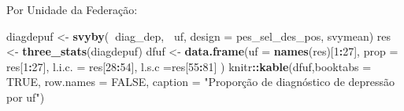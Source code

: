 \documentclass[]{book}
\newenvironment{Shaded}{\begin{snugshade}}{\end{snugshade}}
\newcommand{\KeywordTok}[1]{\textcolor[rgb]{0.13,0.29,0.53}{\textbf{#1}}}
\newcommand{\DataTypeTok}[1]{\textcolor[rgb]{0.13,0.29,0.53}{#1}}
\newcommand{\DecValTok}[1]{\textcolor[rgb]{0.00,0.00,0.81}{#1}}
\newcommand{\StringTok}[1]{\textcolor[rgb]{0.31,0.60,0.02}{#1}}
\newcommand{\OtherTok}[1]{\textcolor[rgb]{0.56,0.35,0.01}{#1}}
\newcommand{\OperatorTok}[1]{\textcolor[rgb]{0.81,0.36,0.00}{\textbf{#1}}}
\newcommand{\NormalTok}[1]{#1}
\theoremstyle{definition}
\theoremstyle{definition}
\theoremstyle{definition}
\theoremstyle{remark}
\begin{document}
Por Unidade da Federação:

\begin{Shaded}
\begin{Highlighting}[]
\NormalTok{diagdepuf <-}\StringTok{ }\KeywordTok{svyby}\NormalTok{(}\OperatorTok{~}\NormalTok{diag_dep, }\OperatorTok{~}\NormalTok{uf, }\DataTypeTok{design =}\NormalTok{ pes_sel_des_pos, svymean)}
\NormalTok{res <-}\StringTok{ }\KeywordTok{three_stats}\NormalTok{(diagdepuf)}
\NormalTok{dfuf <-}\StringTok{ }\KeywordTok{data.frame}\NormalTok{(}\DataTypeTok{uf =} \KeywordTok{names}\NormalTok{(res)[}\DecValTok{1}\OperatorTok{:}\DecValTok{27}\NormalTok{], }\DataTypeTok{prop =}\NormalTok{ res[}\DecValTok{1}\OperatorTok{:}\DecValTok{27}\NormalTok{], }
  \DataTypeTok{l.i.c. =}\NormalTok{ res[}\DecValTok{28}\OperatorTok{:}\DecValTok{54}\NormalTok{], }\DataTypeTok{l.s.c =}\NormalTok{res[}\DecValTok{55}\OperatorTok{:}\DecValTok{81}\NormalTok{]  )}
\NormalTok{knitr}\OperatorTok{::}\KeywordTok{kable}\NormalTok{(dfuf,}\DataTypeTok{booktabs =} \OtherTok{TRUE}\NormalTok{, }\DataTypeTok{row.names =} \OtherTok{FALSE}\NormalTok{, }
\DataTypeTok{caption =} \StringTok{"Proporção de diagnóstico de depressão por uf"}\NormalTok{)}
\end{Highlighting}
\end{Shaded}
\end{document}
